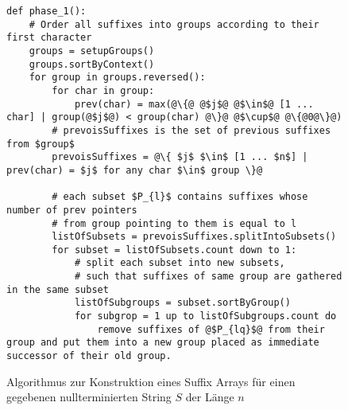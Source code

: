 \begin{figure}
\begin{verbatim}
def phase_1():
	# Order all suffixes into groups according to their first character
	groups = setupGroups()
	groups.sortByContext()
	for group in groups.reversed():
		for char in group:
			prev(char) = max(@\{@ @$j$@ @$\in$@ [1 ... char] | group(@$j$@) < group(char) @\}@ @$\cup$@ @\{@0@\}@)
		# prevoisSuffixes is the set of previous suffixes from $group$
		prevoisSuffixes = @\{ $j$ $\in$ [1 ... $n$] | prev(char) = $j$ for any char $\in$ group \}@

		# each subset $P_{l}$ contains suffixes whose number of prev pointers
		# from group pointing to them is equal to l
		listOfSubsets = prevoisSuffixes.splitIntoSubsets()
		for subset = listOfSubsets.count down to 1:
			# split each subset into new subsets, 
			# such that suffixes of same group are gathered in the same subset
			listOfSubgroups = subset.sortByGroup()
			for subgrop = 1 up to listOfSubgroups.count do
				remove suffixes of @$P_{lq}$@ from their group and put them into a new group placed as immediate successor of their old group.
\end{verbatim}
\caption[Algorithmus zur Konstruktion eines Suffix Arrays für einen gegebenen nullterminierten String $S$ der Länge $n$]{Algorithmus zur Konstruktion eines Suffix Arrays für einen gegebenen nullterminierten String $S$ der Länge $n$}
\label{saca:3:code}
\end{figure}